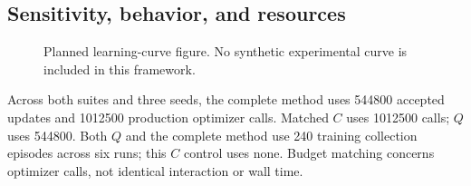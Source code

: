 \subsection{Sensitivity, behavior, and resources}

\begin{figure}[tb]\centering
{}
\caption{Planned learning-curve figure. No synthetic experimental curve
is included in this framework.}\end{figure}
Across both suites and three seeds, the complete method uses 544800 accepted
updates and 1012500 production optimizer calls. Matched $C$ uses 1012500
calls; $Q$ uses 544800. Both $Q$ and the complete method use 240 training
collection episodes across six runs; this $C$ control uses none.
Budget matching concerns optimizer calls, not identical interaction or wall time.
